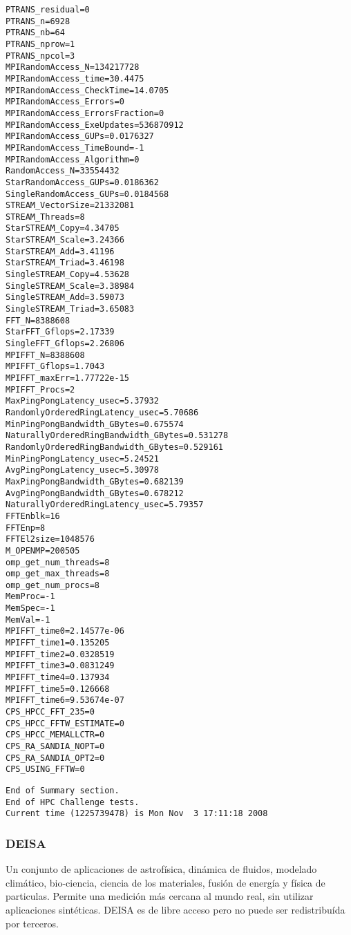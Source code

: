 \documentclass[a4paper]{report}
\begin{document}
\begin{minipage}[b]{0.5\linewidth}
\begin{verbatim}
PTRANS_residual=0
PTRANS_n=6928
PTRANS_nb=64
PTRANS_nprow=1
PTRANS_npcol=3
MPIRandomAccess_N=134217728
MPIRandomAccess_time=30.4475
MPIRandomAccess_CheckTime=14.0705
MPIRandomAccess_Errors=0
MPIRandomAccess_ErrorsFraction=0
MPIRandomAccess_ExeUpdates=536870912
MPIRandomAccess_GUPs=0.0176327
MPIRandomAccess_TimeBound=-1
MPIRandomAccess_Algorithm=0
RandomAccess_N=33554432
StarRandomAccess_GUPs=0.0186362
SingleRandomAccess_GUPs=0.0184568
STREAM_VectorSize=21332081
STREAM_Threads=8
StarSTREAM_Copy=4.34705
StarSTREAM_Scale=3.24366
StarSTREAM_Add=3.41196
StarSTREAM_Triad=3.46198
SingleSTREAM_Copy=4.53628
SingleSTREAM_Scale=3.38984
SingleSTREAM_Add=3.59073
SingleSTREAM_Triad=3.65083
FFT_N=8388608
StarFFT_Gflops=2.17339
SingleFFT_Gflops=2.26806
MPIFFT_N=8388608
MPIFFT_Gflops=1.7043
MPIFFT_maxErr=1.77722e-15
MPIFFT_Procs=2
MaxPingPongLatency_usec=5.37932
RandomlyOrderedRingLatency_usec=5.70686
MinPingPongBandwidth_GBytes=0.675574
NaturallyOrderedRingBandwidth_GBytes=0.531278
RandomlyOrderedRingBandwidth_GBytes=0.529161
MinPingPongLatency_usec=5.24521
AvgPingPongLatency_usec=5.30978
MaxPingPongBandwidth_GBytes=0.682139
AvgPingPongBandwidth_GBytes=0.678212
NaturallyOrderedRingLatency_usec=5.79357
FFTEnblk=16
FFTEnp=8
FFTEl2size=1048576
M_OPENMP=200505
omp_get_num_threads=8
omp_get_max_threads=8
omp_get_num_procs=8
MemProc=-1
MemSpec=-1
MemVal=-1
MPIFFT_time0=2.14577e-06
MPIFFT_time1=0.135205
MPIFFT_time2=0.0328519
MPIFFT_time3=0.0831249
MPIFFT_time4=0.137934
MPIFFT_time5=0.126668
MPIFFT_time6=9.53674e-07
CPS_HPCC_FFT_235=0
CPS_HPCC_FFTW_ESTIMATE=0
CPS_HPCC_MEMALLCTR=0
CPS_RA_SANDIA_NOPT=0
CPS_RA_SANDIA_OPT2=0
CPS_USING_FFTW=0
\end{verbatim}
\end{minipage}

\begin{verbatim}
End of Summary section.
End of HPC Challenge tests.
Current time (1225739478) is Mon Nov  3 17:11:18 2008
\end{verbatim}

\subsubsection{DEISA}

Un conjunto de aplicaciones de astrof\'isica, din\'amica de fluidos, modelado
clim\'atico, bio-ciencia, ciencia de los materiales, fusi\'on de energ\'ia y
f\'isica de particulas. Permite una medici\'on m\'as cercana al mundo real,
sin utilizar aplicaciones sint\'eticas. DEISA es de libre acceso pero no puede
ser redistribu\'ida por terceros.
\end{document}
